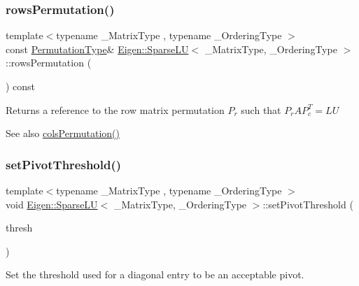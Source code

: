 \subsubsection{\texorpdfstring{rowsPermutation()}{rowsPermutation()}}
{\footnotesize\ttfamily template$<$typename \+\_\+\+Matrix\+Type , typename \+\_\+\+Ordering\+Type $>$ \\
const \mbox{\hyperlink{class_eigen_1_1_permutation_matrix}{Permutation\+Type}}\& \mbox{\hyperlink{class_eigen_1_1_sparse_l_u}{Eigen\+::\+Sparse\+LU}}$<$ \+\_\+\+Matrix\+Type, \+\_\+\+Ordering\+Type $>$\+::rows\+Permutation (\begin{DoxyParamCaption}{ }\end{DoxyParamCaption}) const\hspace{0.3cm}{\ttfamily [inline]}}

\begin{DoxyReturn}{Returns}
a reference to the row matrix permutation $ P_r $ such that $P_r A P_c^T = L U$ 
\end{DoxyReturn}
\begin{DoxySeeAlso}{See also}
\mbox{\hyperlink{class_eigen_1_1_sparse_l_u_ab7b0d15d0d9fd1faa164298f92ca59cd}{cols\+Permutation()}} 
\end{DoxySeeAlso}
\mbox{\label{class_eigen_1_1_sparse_l_u_a94c726c9ebb71a60b529fe47d942ad57}} 
\subsubsection{\texorpdfstring{setPivotThreshold()}{setPivotThreshold()}}
{\footnotesize\ttfamily template$<$typename \+\_\+\+Matrix\+Type , typename \+\_\+\+Ordering\+Type $>$ \\
void \mbox{\hyperlink{class_eigen_1_1_sparse_l_u}{Eigen\+::\+Sparse\+LU}}$<$ \+\_\+\+Matrix\+Type, \+\_\+\+Ordering\+Type $>$\+::set\+Pivot\+Threshold (\begin{DoxyParamCaption}\item[{const Real\+Scalar \&}]{thresh }\end{DoxyParamCaption})\hspace{0.3cm}{\ttfamily [inline]}}

Set the threshold used for a diagonal entry to be an acceptable pivot. \mbox{\label{class_eigen_1_1_sparse_l_u_a6651143e3b18fa90cfb3808b6fd23c4e}} 
